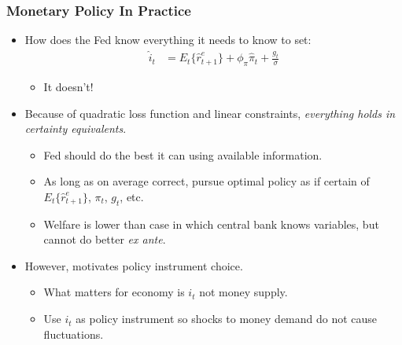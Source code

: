 \documentclass[english,xcolor=svgnames]{beamer}
\begin{document}
\begin{frame}
\frametitle{Monetary Policy In Practice}
\begin{itemize}
	\item How does the Fed know everything it needs to know to set:
	\begin{align*}
		\hat{i}_t &=E_t\{\hat{r}_{t+1}^e\}+\phi_\pi \hat{\pi}_{t}+\frac{g_t}{\sigma}
	\end{align*}
	\begin{itemize}
		\item It doesn't!
	\end{itemize}
 	\item Because of quadratic loss function and linear constraints, \emph{everything holds in certainty equivalents}.
 	\begin{itemize}
 		\item Fed should do the best it can using available information.
 		\item As long as on average correct, pursue optimal policy as if
certain of $E_t\{\hat{r}_{t+1}^e\}$, $\pi_{t}$, $g_t$, etc.
		\item Welfare is lower than case in which central bank knows
variables, but cannot do better \emph{ex ante}.
 	\end{itemize}
 	\item However, motivates policy instrument choice.
 	\begin{itemize}
 		\item What matters for economy is $i_t$ not money supply.
 		\item Use $i_t$ as policy instrument so shocks to money demand do not cause fluctuations.
 	\end{itemize}
 \end{itemize}
\end{frame}
\end{document}
